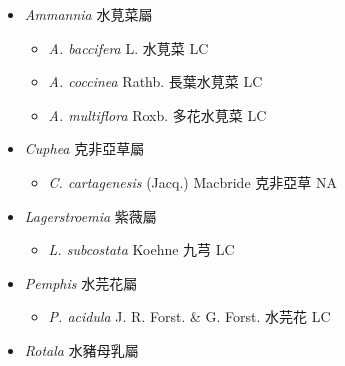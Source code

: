 
  \begin{itemize}
 \item[] \textit{Ammannia} 水莧菜屬
                                
  \begin{itemize}
        \item[] \textit{A. baccifera} L.  水莧菜   LC
        \item[] \textit{A. coccinea} Rathb.  長葉水莧菜   LC
        \item[] \textit{A. multiflora} Roxb.  多花水莧菜   LC
  \end{itemize}
 \item[] \textit{Cuphea} 克非亞草屬
                                
  \begin{itemize}
        \item[] \textit{C. cartagenesis} (Jacq.) Macbride  克非亞草   NA
  \end{itemize}
 \item[] \textit{Lagerstroemia} 紫薇屬
                                
  \begin{itemize}
        \item[] \textit{L. subcostata} Koehne  九芎   LC
  \end{itemize}
 \item[] \textit{Pemphis} 水芫花屬
                                
  \begin{itemize}
        \item[] \textit{P. acidula} J. R. Forst. \& G. Forst.  水芫花   LC
  \end{itemize}
 \item[] \textit{Rotala} 水豬母乳屬
                                

\end{itemize}
